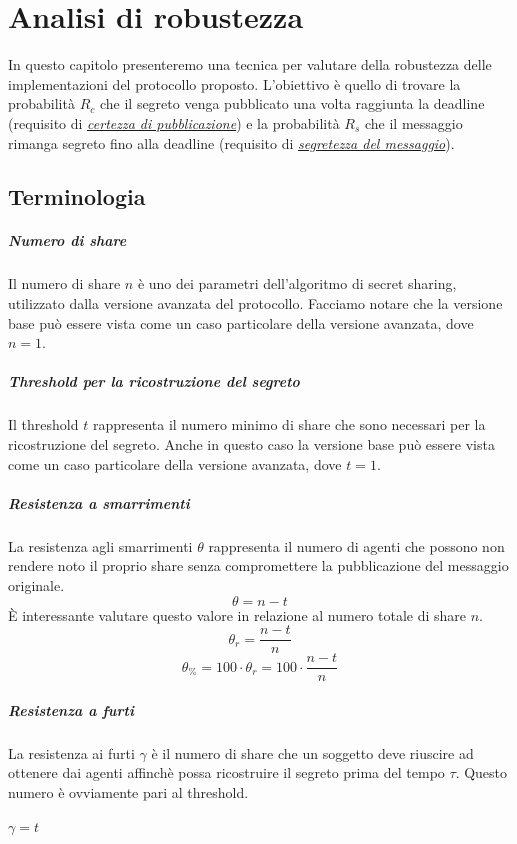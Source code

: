 \chapter{Analisi di robustezza}
\label{chap:analisi-robustezza}
In questo capitolo presenteremo una tecnica per valutare della robustezza delle
implementazioni del protocollo proposto. L'obiettivo è quello di trovare
la probabilità $ R_c $ che il segreto venga pubblicato una volta raggiunta la deadline
(requisito di \hyperref[parag:certezza-pubblicazione]{\textit{certezza di pubblicazione}})
e la probabilità $ R_s $ che il messaggio rimanga segreto fino alla deadline
(requisito di \hyperref[parag:segretezza-tre]{\textit{segretezza del messaggio}}).

\section{Terminologia}

\paragraph{Numero di share}
Il numero di share $ n $ è uno dei parametri
dell'algoritmo di secret sharing, utilizzato dalla versione
avanzata del protocollo.
Facciamo notare che la versione base può essere vista come un caso particolare
della versione avanzata, dove $ n = 1 $.

\paragraph{Threshold per la ricostruzione del segreto}
Il threshold $ t $ rappresenta il numero minimo di share che
sono necessari per la ricostruzione del segreto.
Anche in questo caso la versione base può essere vista come un caso particolare
della versione avanzata, dove $ t = 1 $.

\paragraph{Resistenza a smarrimenti}
La resistenza agli smarrimenti $ \theta $ rappresenta
il numero di agenti che possono non
rendere noto il proprio share senza compromettere la pubblicazione del messaggio
originale.
$$ \theta = n - t $$
È interessante valutare questo valore in relazione
al numero totale di share $ n $.
$$ \theta_r = \frac{n - t}{n} $$
$$ \theta_\% = 100 \cdot \theta_r = 100 \cdot \frac{n - t}{n} $$

\paragraph{Resistenza a furti}
La resistenza ai furti $ \gamma $ è il numero di share che un soggetto deve riuscire
ad ottenere dai agenti affinchè possa
ricostruire il segreto prima del tempo $ \tau $.
Questo numero è ovviamente pari al threshold.
\begin{center}
	$ \gamma = t $
\end{center}


